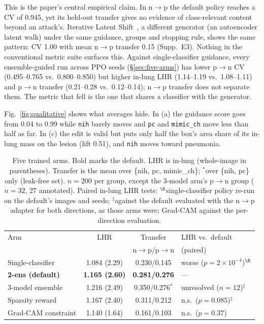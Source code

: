 This is the paper's central empirical claim. In n$\to$p the default policy reaches a CV of 0.945, yet its held-out transfer gives no evidence of class-relevant content beyond an attack's. Iterative Latent Shift~\cite{cohen2021gifsplanation}, a different generator (an autoencoder latent walk) under the same guidance, groups and stopping rule, shows the same pattern: CV 1.00 with mean n$\to$p transfer 0.15 (Supp.~E3). Nothing in the conventional metric suite surfaces this. Against single-classifier guidance, every ensemble-guided run across PPO seeds (\S\ref{sec:five-arms}) has lower p$\to$n CV (0.495--0.765 vs.\ 0.800--0.850) but higher in-lung LHR (1.14--1.19 vs.\ 1.08--1.11) and p$\to$n transfer (0.21--0.28 vs.\ 0.12--0.14); n$\to$p transfer does not separate them. The metric that fell is the one that shares a classifier with the generator.

Fig.~\ref{fig:qualitative} shows what averages hide. In (a) the guidance score goes from 0.04 to 0.99 while \texttt{nih} barely moves and \texttt{pc} and \texttt{mimic\_ch} move less than half as far. In (c) the edit is valid but puts only half the box's area share of its in-lung mass on the lesion (lift 0.51), and \texttt{nih} moves toward pneumonia.

\begin{table}[t]
\centering
\caption{Five trained arms. Bold marks the default. LHR is in-lung (whole-image in parentheses). Transfer is the mean over \{nih, pc, mimic\_ch\}; $^*$over \{nih, pc\} only (leak-free set). $n=200$ per group, except the 3-model arm's p$\to$n group ($n=32$, 27 annotated). Paired in-lung LHR tests: $^{\S}$single-classifier policy re-run on the default's images and seeds; $^{\ddagger}$against the default evaluated with the n$\to$p adapter for both directions, as those arms were; Grad-CAM against the per-direction evaluation.}
\label{tab:five-arms}
\footnotesize
\setlength{\tabcolsep}{2pt}
\begin{tabular}{@{}lccl@{}}
\toprule
Arm & LHR & Transfer & LHR vs.\ default \\
& & n$\to$p/p$\to$n & (paired) \\
\midrule
Single-classifier & 1.084 (2.29) & 0.230/0.145 & worse ($p{=}2{\times}10^{-4}$)$^{\S}$ \\
\textbf{2-ens (default)} & \textbf{1.165 (2.60)} & \textbf{0.281/0.276} & --- \\
3-model ensemble & 1.216 (2.49) & 0.350/0.276$^*$ & unresolved ($n{=}12$)$^{\ddagger}$ \\
Sparsity reward & 1.167 (2.40) & 0.311/0.212 & n.s.\ ($p{=}0.085$)$^{\ddagger}$ \\
Grad-CAM constraint & 1.140 (1.64) & 0.161/0.103 & n.s.\ ($p{=}0.37$) \\
\bottomrule
\end{tabular}
\end{table}

